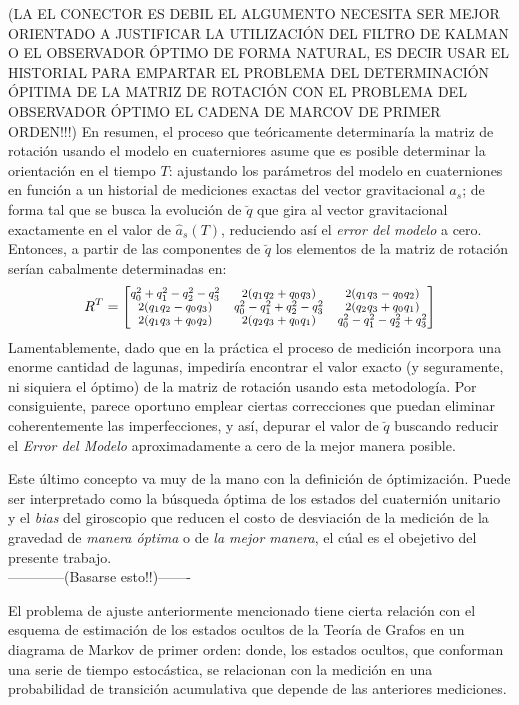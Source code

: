 \documentclass[conference]{IEEEtran}
\begin{document}
(LA EL CONECTOR ES DEBIL EL ALGUMENTO NECESITA SER MEJOR ORIENTADO
A JUSTIFICAR LA UTILIZACIÓN DEL FILTRO DE KALMAN O EL OBSERVADOR ÓPTIMO DE FORMA NATURAL, ES DECIR USAR EL HISTORIAL PARA EMPARTAR EL PROBLEMA DEL DETERMINACIÓN ÓPITIMA DE LA MATRIZ DE ROTACIÓN CON EL PROBLEMA DEL OBSERVADOR ÓPTIMO EL CADENA DE MARCOV DE PRIMER ORDEN!!!)
En resumen, el proceso que teóricamente determinaría la matriz de rotación usando el modelo en cuaterniores asume que es posible determinar la orientación en el tiempo $T$: ajustando los parámetros del modelo en cuaterniones en función a un historial de mediciones exactas del vector gravitacional $a_s$; de forma tal que se busca la evolución de $\breve{q}$ que gira al vector gravitacional exactamente en el valor de $\hat{a}_s(T)$, reduciendo así el \emph{error del modelo} a cero. Entonces, a partir de las componentes de $\breve{q}$ los elementos de la matriz de rotación serían cabalmente determinadas  \cite{Sola2012} en:
\begin{equation}\label{modelo_ecc4}\scriptsize
R^T=\begin{bmatrix} q^2_0+q^2_1-q^2_2-q^2_3&2(q_1q_2+q_0q_3)&2(q_1q_3-q_0q_2)\\ 2(q_1q_2-q_0q_3)&q^2_0-q^2_1+q^2_2-q^2_3&2(q_2q_3+q_0q_1)\\ 2(q_1q_3+q_0q_2)&2(q_2q_3+q_0q_1)&q^2_0-q^2_1-q^2_2+q^2_3\\ \end{bmatrix}
\end{equation} 
Lamentablemente, dado que en la práctica el proceso de medición incorpora una enorme cantidad de lagunas, impediría encontrar el valor exacto (y seguramente, ni siquiera el óptimo) de la matriz de rotación usando esta metodología. Por consiguiente, parece oportuno emplear ciertas correcciones que puedan eliminar coherentemente las imperfecciones, y así, depurar el valor de $\breve{q}$ buscando reducir el \emph{Error del Modelo} aproximadamente a cero de la mejor manera posible.\par
Este último concepto va muy de la mano con la definición de óptimización. Puede ser interpretado como la búsqueda óptima de los estados del cuaternión unitario y el \emph{bias} del giroscopio que reducen el costo de desviación de la medición de la gravedad de \emph{manera óptima} o de \emph{la mejor manera}, el cúal es el obejetivo del presente trabajo.\\
------------(Basarse esto!!)-------\par
El problema de ajuste anteriormente mencionado tiene cierta relación con el esquema de estimación de los estados ocultos de la Teoría de Grafos en un diagrama de Markov de primer orden: donde, los estados ocultos, que conforman una serie de tiempo estocástica, se relacionan con la medición en una probabilidad de transición acumulativa que depende de las anteriores mediciones.\par
\end{document}
